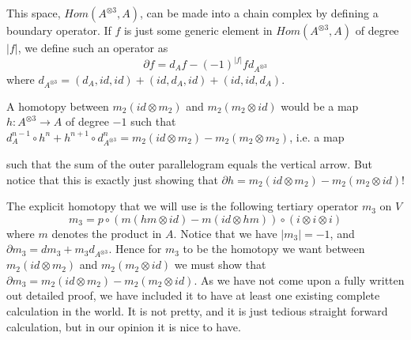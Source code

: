 This space, $Hom(A^{\otimes 3}, A)$, can be made into a chain complex by defining a boundary operator. If $f$ is just some generic element in $Hom(A^{\otimes 3}, A)$ of degree $|f|$, we define such an operator as
\begin{equation*}
    \partial f = d_A f - (-1)^{|f|} f d_{A^{\otimes 3}}
\end{equation*}
where $d_{A^{\otimes 3}} = (d_A, id, id)+(id, d_A, id)+(id, id, d_A)$. 

A homotopy between $m_2(id\otimes m_2)$ and $m_2(m_2\otimes id)$ would be a map $h\colon A^{\otimes 3}\longrightarrow A$ of degree $-1$ such that $d_A^{n-1}\circ h^{n} + h^{n+1}\circ d_{A^{\otimes 3}}^n = m_2(id\otimes m_2)-m_2(m_2\otimes m_2)$, i.e. a map
\begin{center}
\end{center}
such that the sum of the outer parallelogram equals the vertical arrow. But notice that this is exactly just showing that $\partial h = m_2(id\otimes m_2)-m_2(m_2\otimes id)$!

The explicit homotopy that we will use is the following tertiary operator $m_3$ on $V$
\begin{equation*}
    m_3 = p\circ (m(hm\otimes id)-m(id\otimes hm))\circ (i\otimes i \otimes i)
\end{equation*}
where $m$ denotes the product in $A$. Notice that we have $|m_3|=-1$, and $\partial m_3 = dm_3 + m_3 d_{A^{\otimes 3}}$. Hence for $m_3$ to be the homotopy we want between $m_2(id\otimes m_2)$ and $m_2(m_2\otimes id)$ we must show that $\partial m_3 = m_2(id\otimes m_2)-m_2(m_2\otimes id)$. As we have not come upon a fully written out detailed proof, we have included it to have at least one existing complete calculation in the world. It is not pretty, and it is just tedious straight forward calculation, but in our opinion it is nice to have. 

